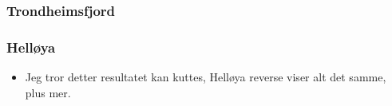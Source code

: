 \subsubsection{Trondheimsfjord}


\subsubsection{Helløya}
\begin{itemize}
    \item Jeg tror detter resultatet kan kuttes, Helløya reverse viser alt det samme, plus mer.
\end{itemize}

